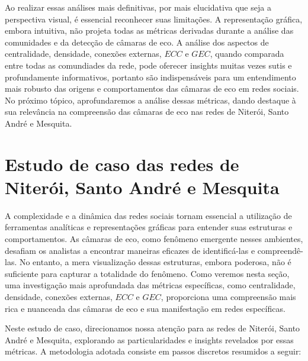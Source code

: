 Ao realizar essas análises mais definitivas, por mais elucidativa que seja a perspectiva visual, é essencial reconhecer suas limitações. A representação gráfica, embora intuitiva, não projeta todas as métricas derivadas durante a análise das comunidades e da detecção de câmaras de eco. A análise dos aspectos de centralidade, densidade, conexões externas, $ECC$ e $GEC$, quando comparada entre todas as comundiades da rede, pode oferecer insights muitas vezes sutis e profundamente informativos, portanto são indispensáveis para um entendimento mais robusto das origens e comportamentos das câmaras de eco em redes sociais. No próximo tópico, aprofundaremos a análise dessas métricas, dando destaque à sua relevância na compreensão das câmaras de eco nas redes de Niterói, Santo André e Mesquita.

\section{Estudo de caso das redes de Niterói, Santo André e Mesquita}

A complexidade e a dinâmica das redes sociais tornam essencial a utilização de ferramentas analíticas e representações gráficas para entender suas estruturas e comportamentos. As câmaras de eco, como fenômeno emergente nesses ambientes, desafiam os analistas a encontrar maneiras eficazes de identificá-las e compreendê-las. No entanto, a mera visualização dessas estruturas, embora poderosa, não é suficiente para capturar a totalidade do fenômeno. Como veremos nesta seção, uma investigação mais aprofundada das métricas específicas, como centralidade, densidade, conexões externas, $ECC$ e $GEC$, proporciona uma compreensão mais rica e nuanceada das câmaras de eco e sua manifestação em redes específicas. 

Neste estudo de caso, direcionamos nossa atenção para as redes de Niterói, Santo André e Mesquita, explorando as particularidades e insights revelados por essas métricas. A metodologia adotada consiste em passos discretos resumidos a seguir:

